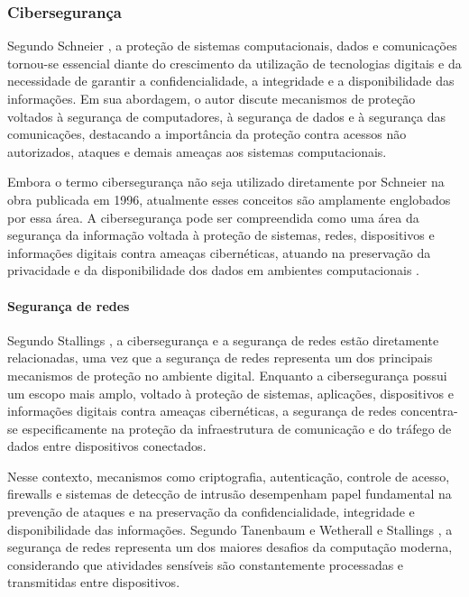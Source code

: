\documentclass[
    12pt,                %
    openright,           %
    oneside,             %
    a4paper,             %
    english,             %
    brazil               %
]{abntex2}
\begin{document}
\subsubsection{Cibersegurança}

Segundo Schneier \cite{schneier1996}, a proteção de sistemas computacionais, dados e comunicações tornou-se essencial diante do crescimento da utilização de tecnologias digitais e da necessidade de garantir a confidencialidade, a integridade e a disponibilidade das informações. Em sua abordagem, o autor discute mecanismos de proteção voltados à segurança de computadores, à segurança de dados e à segurança das comunicações, destacando a importância da proteção contra acessos não autorizados, ataques e demais ameaças aos sistemas computacionais.

Embora o termo cibersegurança não seja utilizado diretamente por Schneier na obra publicada em 1996, atualmente esses conceitos são amplamente englobados por essa área. A cibersegurança pode ser compreendida como uma área da segurança da informação voltada à proteção de sistemas, redes, dispositivos e informações digitais contra ameaças cibernéticas, atuando na preservação da privacidade e da disponibilidade dos dados em ambientes computacionais \cite{stallings2022}.

\paragraph{Segurança de redes}

Segundo Stallings \cite{stallings2022}, a cibersegurança e a segurança de redes estão diretamente relacionadas, uma vez que a segurança de redes representa um dos principais mecanismos de proteção no ambiente digital. Enquanto a cibersegurança possui um escopo mais amplo, voltado à proteção de sistemas, aplicações, dispositivos e informações digitais contra ameaças cibernéticas, a segurança de redes concentra-se especificamente na proteção da infraestrutura de comunicação e do tráfego de dados entre dispositivos conectados.

Nesse contexto, mecanismos como criptografia, autenticação, controle de acesso, firewalls e sistemas de detecção de intrusão desempenham papel fundamental na prevenção de ataques e na preservação da confidencialidade, integridade e disponibilidade das informações. Segundo Tanenbaum e Wetherall \cite{tanenbaum2011} e Stallings \cite{stallings2022}, a segurança de redes representa um dos maiores desafios da computação moderna, considerando que atividades sensíveis são constantemente processadas e transmitidas entre dispositivos.
\end{document}
